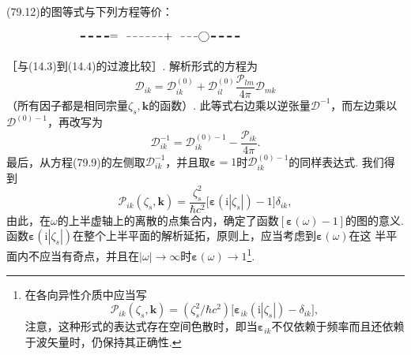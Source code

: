 (79.12)的图等式与下列方程等价：
\begin{equation}
\setlength{\unitlength}{0.72pt}%
\begin{picture}(330,26)(0,0)
  \linethickness{1.3pt}%
  \multiput(8,13)(10,0){4}{\line(1,0){6}}%
  \put(50,13){\makebox(0,0){$=$}}%
  \linethickness{0.4pt}%
  \multiput(66,13)(8,0){6}{\line(1,0){5}}%
  \put(118,13){\makebox(0,0){$+$}}%
  \multiput(134,13)(8,0){3}{\line(1,0){5}}%
  \put(163,13){\circle{12}}%
  \linethickness{1.3pt}%
  \multiput(172,13)(10,0){4}{\line(1,0){6}}%
\end{picture}
\end{equation}
［与(14.3)到(14.4)的过渡比较］. 解析形式的方程为
\begin{equation}
\mathcal{D}_{ik}=\mathcal{D}_{ik}^{(0)}+\mathcal{D}_{il}^{(0)}\frac{\mathcal{P}_{lm}}{4\pi}\mathcal{D}_{mk}
\end{equation}
（所有因子都是相同宗量$\zeta_{s},\bm{k}$的函数）. 此等式右边乘以逆张量$\mathcal{D}^{-1}$，而左边乘以$\mathcal{D}^{(0)-1}$，再改写为
\begin{equation}
\mathcal{D}_{ik}^{-1}=\mathcal{D}_{ik}^{(0)-1}-\frac{\mathcal{P}_{ik}}{4\pi}.
\end{equation}
最后，从方程(79.9)的左侧取$\mathcal{D}_{ik}^{-1}$，并且取$\bm{\varepsilon}=1$时$\mathcal{D}_{ik}^{(0)-1}$的同样表达式. 我们得到
\begin{equation}
\mathcal{P}_{ik}(\zeta_{s},\bm{k})=\frac{\zeta_{s}^{2}}{\hbar c^{2}}\bigl[\bm{\varepsilon}(\mathrm{i}|\zeta_{s}|)-1\bigr]\delta_{ik},
\end{equation}
由此，在$\omega$的上半虚轴上的离散的点集合内，确定了函数$[\bm{\varepsilon}(\omega)-1]$的图的意义. 函数$\bm{\varepsilon}(\mathrm{i}|\zeta_{s}|)$在整个上半平面的解析延拓，原则上，应当考虑到$\bm{\varepsilon}(\omega)$在这
半平面内不应当有奇点，并且在$|\omega|\to\infty$时$\bm{\varepsilon}(\omega)\to1$\footnote{在各向异性介质中应当写
\begin{equation*}
\mathcal{P}_{ik}(\zeta_{s},\bm{k})=(\zeta_{s}^{2}/\hbar c^{2})\bigl[\bm{\varepsilon}_{ik}(\mathrm{i}|\zeta_{s}|)-\delta_{ik}\bigr],
\end{equation*}
注意，这种形式的表达式存在空间色散时，即当$\bm{\varepsilon}_{ik}$不仅依赖于频率而且还依赖于波矢量时，仍保持其正确性.}.

